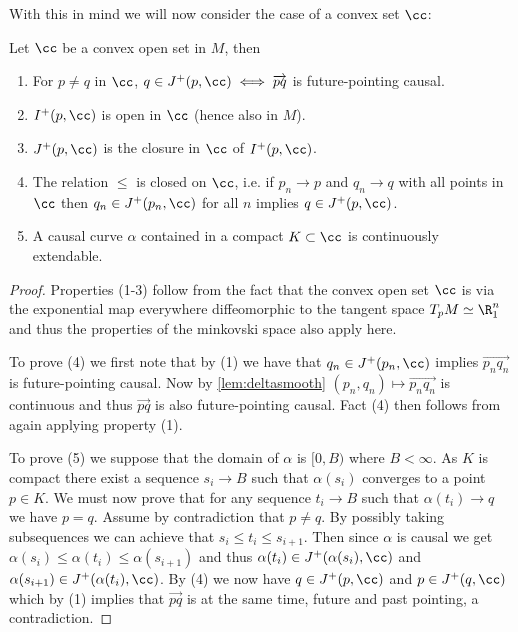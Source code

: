 With this in mind we will now consider the case of a convex set $\cc$:
\begin{lemma}\label{lem:convtopo}
Let $\cc$ be a convex open set in $M$, then
\begin{enumerate}[label={\textnormal{(\arabic*)}}]
    \item For $p\neq q$ in $\cc$, $q\in J^+(p,\cc) \iff \overrightarrow{pq}$ is future-pointing causal.
    \item $I^+(p,\cc)$ is open in $\cc$ (hence also in $M$).
    \item $J^+(p,\cc)$ is the closure in $\cc$ of $I^+(p,\cc)$.
    \item The relation $\leq$ is closed on $\cc$, i.e. if $p_n \to p$ and $q_n \to q$ with all points in $\cc$ then $q_n\in J^+(p_n,\cc)$ for all $n$ implies $q\in J^+(p,\cc)$.
    \item A causal curve $\alpha$ contained in a compact $K\subset\cc$ is continuously extendable. 
\end{enumerate}
\end{lemma}
\begin{proof}
Properties (1-3) follow from the fact that the convex open set $\cc$ is via the exponential map everywhere diffeomorphic to the tangent space $T_pM\simeq \R^n_1$ and thus the properties of the minkovski space also apply here.

To prove (4) we first note that by (1) we have that $q_n\in J^+(p_n,\cc)$ implies $\overrightarrow{p_nq_n}$ is future-pointing causal. Now by \ref{lem:deltasmooth} $(p_n,q_n)\mapsto\overrightarrow{p_nq_n}$ is continuous and thus $\overrightarrow{pq}$ is also future-pointing causal. Fact (4) then follows from again applying property (1). 

To prove (5) we suppose that the domain of $\alpha$ is $[0,B)$ where $B<\infty$. As $K$ is compact there exist a sequence $s_i\to B$ such that $\alpha(s_i)$ converges to a point $p\in K$. We must now prove that for any sequence $t_i\to B$ such that $\alpha(t_i)\to q$ we have $p=q$. Assume by contradiction that $p\neq q$. By possibly taking subsequences we can achieve that $s_i \le t_i \le s_{i+1}$.
Then since $\alpha$ is causal we get  $\alpha(s_i)\le \alpha(t_i) \le \alpha(s_{i+1})$ and thus $\alpha(t_i) \in J^+(\alpha(s_i),\cc)$ and $\alpha(s_{i+1}) \in J^+(\alpha(t_i),\cc)$. By (4) we now have $q\in J^+(p,\cc)$ and $p\in J^+(q,\cc)$ which by (1) implies that $\overrightarrow{pq}$ is at the same time, future and past pointing, a contradiction.
\end{proof}

